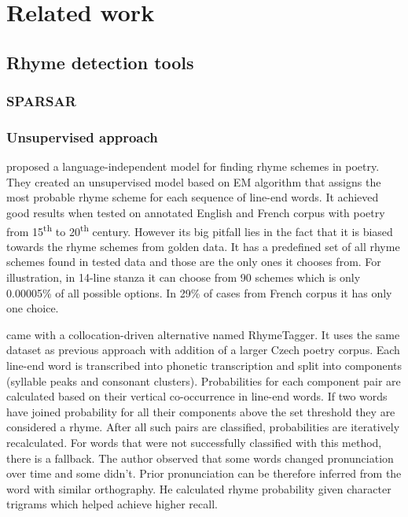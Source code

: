 \chapter{Related work}


\section{Rhyme detection tools}
\subsection{SPARSAR}


\subsection{Unsupervised approach}
\cite{reddy2011unsupervised} proposed a language-independent model for finding rhyme schemes in poetry. They created an unsupervised model based on EM algorithm that assigns the most probable rhyme scheme for each sequence of line-end words. It achieved good results when tested on annotated English and French corpus with poetry from 15\textsuperscript{th} to 20\textsuperscript{th} century. However its big pitfall lies in the fact that it is biased towards the rhyme schemes from golden data. It has a predefined set of all rhyme schemes found in tested data and those are the only ones it chooses from. For illustration, in 14-line stanza it can choose from 90 schemes which is only 0.00005\% of all possible options. In 29\% of cases from French corpus it has only one choice.

\cite{plechavc2018collocation} came with a collocation-driven alternative named RhymeTagger. It uses the same dataset as previous approach with addition of a larger Czech poetry corpus. Each line-end word is transcribed into phonetic transcription and split into components (syllable peaks and consonant clusters). Probabilities for each component pair are calculated based on their vertical co-occurrence in line-end words. If two words have joined probability for all their components above the set threshold they are considered a rhyme. After all such pairs are classified, probabilities are iteratively recalculated. For words that were not successfully classified with this method, there is a fallback. The author observed that some words changed pronunciation over time and some didn't. Prior pronunciation can be therefore inferred from the word with similar orthography. He calculated rhyme probability given character trigrams which helped achieve higher recall.

